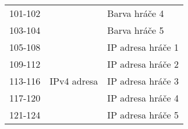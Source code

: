\begin{table}[hbtp]
\begin{tabular}{|c|c|l|}
101-102 &             & Barva hráče 4                                                   \\ \cline{1-1} \cline{3-3}
103-104 &             & Barva hráče 5                                                   \\ \hline
105-108 &             & IP adresa hráče 1                                               \\ \cline{1-1} \cline{3-3}
109-112 &             & IP adresa hráče 2                                               \\ \cline{1-1} \cline{3-3}
113-116 & IPv4 adresa & IP adresa hráče 3                                               \\ \cline{1-1} \cline{3-3}
117-120 &             & IP adresa hráče 4                                               \\ \cline{1-1} \cline{3-3}
121-124 &             & IP adresa hráče 5                                               \\ \hline
\end{tabular}
\end{table}
